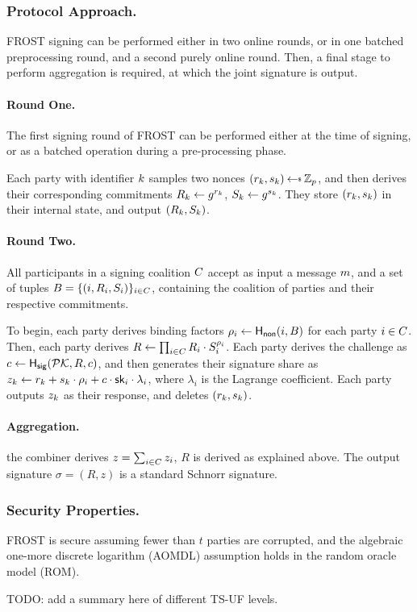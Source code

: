 \subsubsection{Protocol Approach.}

FROST signing can be performed either in two online rounds,
or in one batched preprocessing round,
and a second purely online round.
Then, a final stage to perform aggregation is required,
at which the joint signature is output.

\paragraph{Round One.}
The first signing round of FROST can be performed either at the time of signing,
or as a batched operation during a pre-processing phase.

Each party with identifier $k$ samples two nonces $(r_\partyid, s_\partyid) \randpick \Zp$,
and then derives their corresponding commitments $R_k \gets g^{r_k}$, $ S_k \gets g^{s_k}$.
They store $(r_k, s_k)$ in their internal state,
and output $(R_k, S_k)$.

\paragraph{Round Two.}
All participants in a signing coalition $C$ accept as input a message $m$,
and a set of tuples $B = \{ (i, R_i, S_i)\}_{i \in C}$,
containing the coalition of parties and their respective commitments.

To begin,
each party derives binding factors $\rho_i \gets \mathsf{H_{non}}(i, B)$ for each party $i \in C$.
Then, each party derives $R \gets \prod_{i \in C} R_i \cdot S_i^{\rho_i}$.
Each party derives the challenge as $c \gets \mathsf{H_{sig}}(\mathcal{PK}, R, c)$,
and then generates their signature share as
$z_k \gets r_k + s_k \cdot \rho_i + c \cdot \mathsf{sk}_i \cdot \lambda_i$,
where $\lambda_i$ is the Lagrange coefficient.
Each party outputs $z_k$ as their response,
and deletes $(r_k, s_k)$.


\paragraph{Aggregation.}
the combiner derives $z = \sum_{i \in C} z_i$,
$R$ is derived as explained above.
The output signature $\sigma = (R,z)$ is a standard Schnorr signature.

\subsubsection{Security Properties.}

FROST is secure assuming fewer than $t$ parties are corrupted,
and the algebraic one-more discrete logarithm (AOMDL) assumption holds in the random oracle model (ROM).

TODO: add a summary here of different TS-UF levels.




